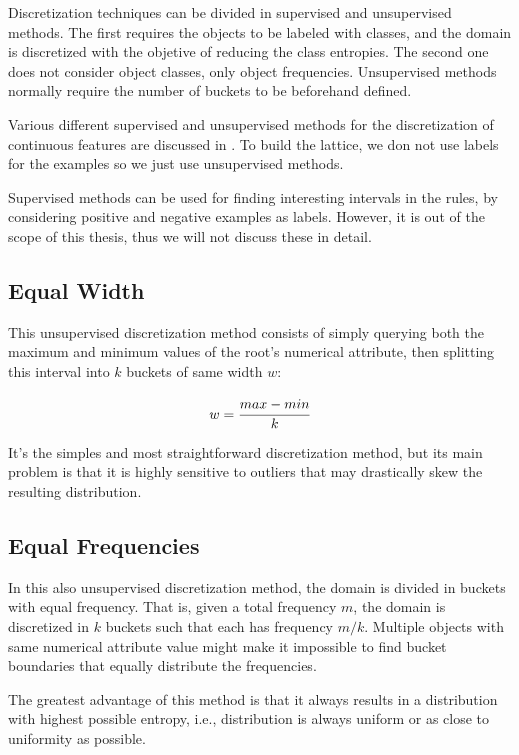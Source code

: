 Discretization techniques can be divided in supervised and unsupervised methods. The first requires the objects to
be labeled with classes, and the domain is discretized with the objetive of reducing the class entropies. The second
one does not consider object classes, only object frequencies. Unsupervised methods normally require the number of
buckets to be beforehand defined.

Various different supervised and unsupervised methods for the discretization of continuous features are discussed in
\cite{Dougherty95supervisedand}. To build the lattice, we don not use labels for the examples so we just use
unsupervised methods.

Supervised methods can be used for finding interesting intervals in the rules, by considering positive and negative
examples as labels. However, it is out of the scope of this thesis, thus we will not discuss these in detail.

\subsection{Equal Width}
This unsupervised discretization method consists of simply querying both the maximum and minimum values of the root's
numerical attribute, then splitting this interval into $k$ buckets of same width $w$:

\begin{equation}
 w=\cfrac{max-min}{k}
\end{equation}

It's the simples and most straightforward discretization method, but its main problem is that it is highly
sensitive to outliers that may drastically skew the resulting distribution.

\subsection{Equal Frequencies}
In this also unsupervised discretization method, the domain is divided in buckets with equal frequency. That is, given
a
total frequency $m$, the domain is discretized in $k$ buckets such that each has frequency $m/k$. Multiple
objects with same numerical attribute value might make it impossible to find bucket boundaries that equally
distribute the frequencies.

The greatest advantage of this method is that it always results in a distribution with highest possible entropy, i.e.,
distribution is always uniform or as close to uniformity as possible.

